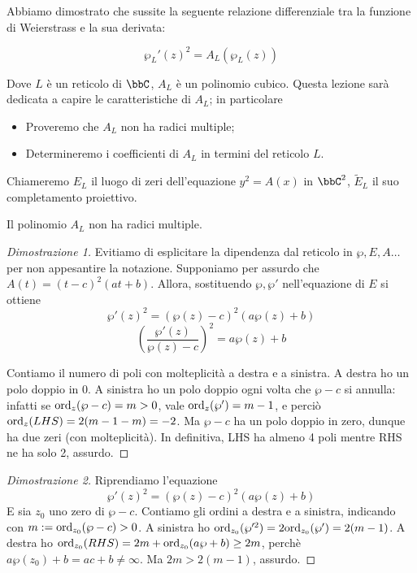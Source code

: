 
Abbiamo dimostrato che sussite la seguente relazione differenziale tra la funzione di Weierstrass e la sua derivata:

$$\wp_L'(z)^2 = A_L(\wp_L(z)) $$

Dove $L$ è un reticolo di $\bbC$,  $A_L$ è un polinomio cubico. Questa lezione sarà dedicata a capire le caratteristiche di $A_L$; in particolare
\begin{itemize}
\item Proveremo che $A_L$ non ha radici multiple;
\item Determineremo i coefficienti di $A_L$ in termini del reticolo $L$.
\end{itemize}

Chiameremo $E_L$ il luogo di zeri dell'equazione $y^2=A(x)$ in $\bbC^2$, $\tilde{E}_L$ il suo completamento proiettivo.
\begin{proposizione}
Il polinomio $A_L$ non ha radici multiple.
\end{proposizione}

\begin{proof}[Dimostrazione 1]
Evitiamo di esplicitare la dipendenza dal reticolo in $\wp, E,A \dots$ per non appesantire la notazione. Supponiamo per assurdo che $A(t) = (t-c)^2(at+b)$. Allora, sostituendo $\wp, \wp'$ nell'equazione di $E$ si ottiene
$$\wp'(z)^2 = (\wp(z) - c)^2(a\wp(z)+b) $$
$$ \left ( \frac{\wp'(z)}{\wp(z)-c} \right )^2 = a\wp(z)+b $$

Contiamo il numero di poli con molteplicità a destra e a sinistra. A destra ho un polo doppio in $0$. A sinistra ho un polo doppio ogni volta che $\wp - c$ si annulla: infatti se $\text{ord}_{z}(\wp -c) = m > 0$, vale $\text{ord}_{z}(\wp') = m-1$, e perciò $\text{ord}_{z}(LHS) = 2(m-1-m) = -2$. Ma $\wp-c$ ha un polo doppio in zero, dunque ha due zeri (con molteplicità). In definitiva, LHS ha almeno 4 poli mentre RHS ne ha solo 2, assurdo.
\end{proof}

\begin{proof}[Dimostrazione 2]
Riprendiamo l'equazione 
$$\wp'(z)^2 = (\wp(z) - c)^2(a\wp(z)+b) $$
E sia $z_0$ uno zero di $\wp-c$. Contiamo gli ordini a destra e a sinistra, indicando con $m:=\text{ord}_{z_0}(\wp-c) > 0$. 
A sinistra ho $\text{ord}_{z_0}( \wp'^2) = 2\text{ord}_{z_0}( \wp') = 2(m-1)$. A destra ho $\text{ord}_{z_0}(RHS) = 2m + \text{ord}_{z_0}(a\wp+b) \ge 2m$, perchè $a \wp(z_0)+b = ac+b \neq \infty$. Ma $2m> 2(m-1)$, assurdo.
\end{proof}

